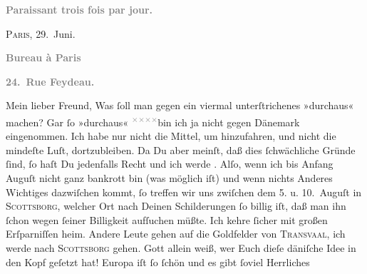 \begin{ledgroupsized}[t]{13cm}
           \pstart
           \begin{otherlanguage}{french}\textcolor{gray}{\textbf{\textbf{Paraissant trois fois par jour.}}}\end{otherlanguage}\hfill \textsc{Paris}, 29. Juni.\pend
           \pstart
           \begin{otherlanguage}{french}\textcolor{gray}{\textbf{\textbf{Bureau à Paris}}}\end{otherlanguage}\pend
           \pstart
           \begin{otherlanguage}{french}\textcolor{gray}{\textbf{\textbf{24. Rue Feydeau.}}}\end{otherlanguage}\pend
           \pstart\center{}Mein lieber Freund,\pend\pstart
           Was ſoll man gegen ein viermal unterſtrichenes »durchaus« machen? Gar ſo »durchaus« \substVorne{}\textsuperscript{\textcolor{gray}{×}\-\textcolor{gray}{×}\-\textcolor{gray}{×}\-\textcolor{gray}{×}}\substDazwischen{}bin\substHinten{} ich ja nicht gegen Dänemark
               eingenommen. Ich habe nur nicht die Mittel, um hinzufahren, und nicht die mindeſte
               Luſt, dortzubleiben. Da Du aber meinſt, daß dies ſchwächliche Gründe ſind, ſo haſt Du
               jedenfalls Recht und ich werde \label{K_L02779-1v}\label{K_L02779-1h}. Alſo, wenn ich bis Anfang {\pb}Auguſt nicht ganz bankrott bin (was möglich iſt) und wenn
               nichts Anderes Wichtiges dazwiſchen kommt, ſo treffen wir uns zwiſchen dem 5. u. 10. Auguſt in \textsc{Scottsborg}, welcher Ort nach Deinen
               Schilderungen ſo billig iſt, daß man ihn ſchon wegen ſeiner Billigkeit aufſuchen
               müßte. Ich kehre ſicher mit großen Erſparniſſen heim. Andere Leute gehen auf die
               Goldfelder von \textsc{Transvaal}, ich werde nach \textsc{Scottsborg} gehen. Gott allein weiß, wer Euch dieſe däniſche Idee in den Kopf geſetzt hat! {\pb}Europa iſt ſo ſchön und es gibt ſoviel Herrliches

\end{ledgroupsized}
